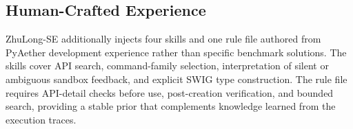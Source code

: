 \subsection{Human-Crafted Experience}
\label{sec:method_experience}

ZhuLong-SE additionally injects four skills and one rule file authored from PyAether development experience rather than specific benchmark solutions. The skills cover API search, command-family selection, interpretation of silent or ambiguous sandbox feedback, and explicit SWIG type construction. The rule file requires API-detail checks before use, post-creation verification, and bounded search, providing a stable prior that complements knowledge learned from the execution traces.
